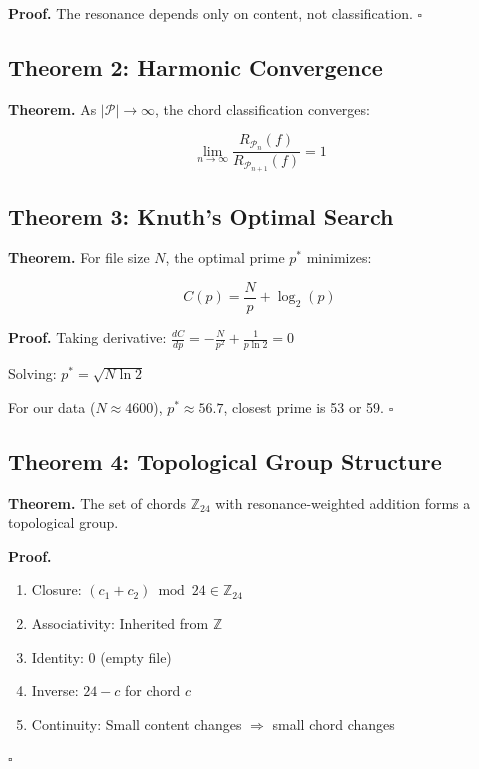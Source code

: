 \documentclass{article}
\begin{document}
\textbf{Proof.} The resonance depends only on content, not classification. $\square$

\subsection{Theorem 2: Harmonic Convergence}

\textbf{Theorem.} As $|\mathcal{P}| \to \infty$, the chord classification converges:

\begin{equation}
\lim_{n \to \infty} \frac{R_{\mathcal{P}_n}(f)}{R_{\mathcal{P}_{n+1}}(f)} = 1
\end{equation}

\subsection{Theorem 3: Knuth's Optimal Search}

\textbf{Theorem.} For file size $N$, the optimal prime $p^*$ minimizes:

\begin{equation}
C(p) = \frac{N}{p} + \log_2(p)
\end{equation}

\textbf{Proof.} Taking derivative: $\frac{dC}{dp} = -\frac{N}{p^2} + \frac{1}{p \ln 2} = 0$

Solving: $p^* = \sqrt{N \ln 2}$

For our data ($N \approx 4600$), $p^* \approx 56.7$, closest prime is 53 or 59. $\square$

\subsection{Theorem 4: Topological Group Structure}

\textbf{Theorem.} The set of chords $\mathbb{Z}_{24}$ with resonance-weighted addition 
forms a topological group.

\textbf{Proof.} 
\begin{enumerate}
\item Closure: $(c_1 + c_2) \bmod 24 \in \mathbb{Z}_{24}$
\item Associativity: Inherited from $\mathbb{Z}$
\item Identity: $0$ (empty file)
\item Inverse: $24 - c$ for chord $c$
\item Continuity: Small content changes $\Rightarrow$ small chord changes
\end{enumerate}
$\square$
\end{document}
